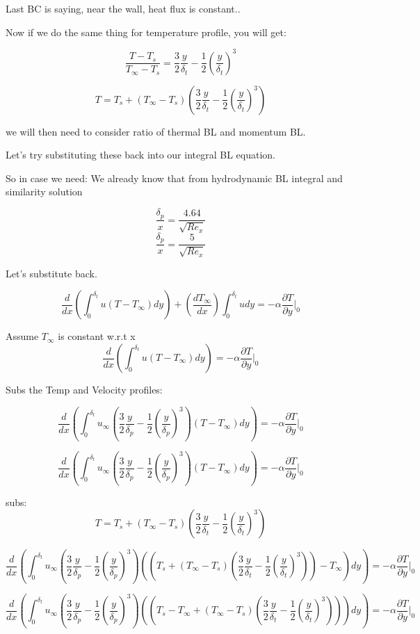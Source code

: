 \documentclass[11pt]{article}
\begin{document}
Last BC is saying, near the wall, heat flux is constant..

Now if we do the same thing for temperature profile, you will get:

$$\frac{T-T_s}{T_\infty-T_s} = \frac{3}{2} \frac{y}{\delta_t} - \frac{1}{2} (\frac{y}{\delta_t})^3$$

$$T = T_s + (T_\infty -T_s)(\frac{3}{2} \frac{y}{\delta_t} - \frac{1}{2} (\frac{y}{\delta_t})^3) $$

we will then need to consider ratio of thermal BL and momentum BL.

Let's try substituting these back into our integral BL equation.

So in case we need:
We already know that from hydrodynamic BL integral and similarity solution

$$\frac{\delta_p}{x} = \frac{4.64}{\sqrt{Re_x}}$$
$$\frac{\delta_p}{x} = \frac{5}{\sqrt{Re_x}}$$

Let's substitute back.

$$ \frac{d}{dx} \left( \int_{0}^{\delta_t} u(T-T_\infty) dy \right)   + \left( \frac{d T_\infty }{dx} \right) \int_{0}^{\delta_t} u dy = - \alpha \frac{\partial T}{\partial y} |_0 $$ 

Assume $T_\infty$ is constant w.r.t x
$$ \frac{d}{dx} \left( \int_{0}^{\delta_t} u(T-T_\infty) dy \right)  = - \alpha \frac{\partial T}{\partial y} |_0 $$ 

Subs the Temp and Velocity profiles:

$$ \frac{d}{dx} \left( \int_{0}^{\delta_t} u_\infty(\frac{3}{2} \frac{y}{\delta_p} - \frac{1}{2} (\frac{y}{\delta_p})^3)(T-T_\infty) dy \right)  = - \alpha \frac{\partial T}{\partial y} |_0 $$ 


$$ \frac{d}{dx} \left( \int_{0}^{\delta_t} u_\infty(\frac{3}{2} \frac{y}{\delta_p} - \frac{1}{2} (\frac{y}{\delta_p})^3)(T-T_\infty) dy \right)  = - \alpha \frac{\partial T}{\partial y} |_0 $$ 

subs:
$$T = T_s + (T_\infty -T_s)(\frac{3}{2} \frac{y}{\delta_t} - \frac{1}{2} (\frac{y}{\delta_t})^3) $$

$$ \frac{d}{dx} \left( \int_{0}^{\delta_t} u_\infty(\frac{3}{2} \frac{y}{\delta_p} - \frac{1}{2} (\frac{y}{\delta_p})^3)((T_s + (T_\infty -T_s)(\frac{3}{2} \frac{y}{\delta_t} - \frac{1}{2} (\frac{y}{\delta_t})^3))-T_\infty) dy \right)  = - \alpha \frac{\partial T}{\partial y} |_0 $$ 

$$ \frac{d}{dx} \left( \int_{0}^{\delta_t} u_\infty(\frac{3}{2} \frac{y}{\delta_p} - \frac{1}{2} (\frac{y}{\delta_p})^3)((T_s-T_\infty + (T_\infty -T_s)(\frac{3}{2} \frac{y}{\delta_t} - \frac{1}{2} (\frac{y}{\delta_t})^3))) dy \right)  = - \alpha \frac{\partial T}{\partial y} |_0 $$ 
\end{document}
